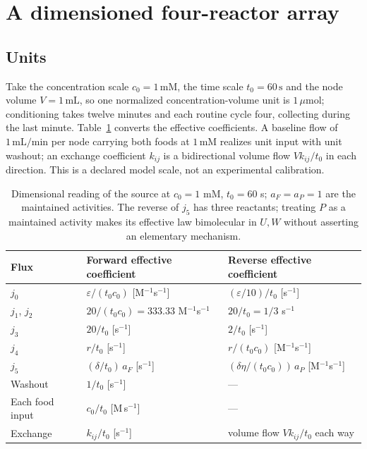 \documentclass[11pt,a4paper]{article}
\theoremstyle{plain}
\theoremstyle{definition}
\theoremstyle{remark}
\newcommand{\eps}{\varepsilon}
\newcommand{\umol}{\,\mu\mathrm{mol}}
\begin{document}
\section{A dimensioned four-reactor array}\label{sec:units}

\subsection{Units}
Take the concentration scale $c_0=1\,\mathrm{mM}$, the time scale $t_0=60\,\mathrm s$ and the node volume $V=1\,\mathrm{mL}$, so one normalized concentration-volume unit is $1\umol$; conditioning takes twelve minutes and each routine cycle four, collecting during the last minute. Table~\ref{tab:units} converts the effective coefficients. A baseline flow of $1\,\mathrm{mL/min}$ per node carrying both foods at $1\,\mathrm{mM}$ realizes unit input with unit washout; an exchange coefficient $k_{ij}$ is a bidirectional volume flow $Vk_{ij}/t_0$ in each direction. This is a declared model scale, not an experimental calibration.

\begin{table}[tb]
\centering\small
\begin{tabular}{lll}\toprule
Flux & Forward effective coefficient & Reverse effective coefficient\\\midrule
$j_0$ & $\eps/(t_0c_0)$ [M$^{-1}$s$^{-1}$] & $(\eps/10)/t_0$ [s$^{-1}$]\\
$j_1$, $j_2$ & $20/(t_0c_0)=333.33$ M$^{-1}$s$^{-1}$ & $20/t_0=1/3$ s$^{-1}$\\
$j_3$ & $20/t_0$ [s$^{-1}$] & $2/t_0$ [s$^{-1}$]\\
$j_4$ & $r/t_0$ [s$^{-1}$] & $r/(t_0c_0)$ [M$^{-1}$s$^{-1}$]\\
$j_5$ & $(\delta/t_0)\,a_F$ [s$^{-1}$] & $(\delta\eta/(t_0c_0))\,a_P$ [M$^{-1}$s$^{-1}$]\\
Washout & $1/t_0$ [s$^{-1}$] & ---\\
Each food input & $c_0/t_0$ [M\,s$^{-1}$] & ---\\
Exchange & $k_{ij}/t_0$ [s$^{-1}$] & volume flow $Vk_{ij}/t_0$ each way\\\bottomrule
\end{tabular}
\caption{Dimensional reading of the source at $c_0=1$ mM, $t_0=60$ s; $a_F=a_P=1$ are the maintained activities. The reverse of $j_5$ has three reactants; treating $P$ as a maintained activity makes its effective law bimolecular in $U,W$ without asserting an elementary mechanism.}
\label{tab:units}
\end{table}
\end{document}
